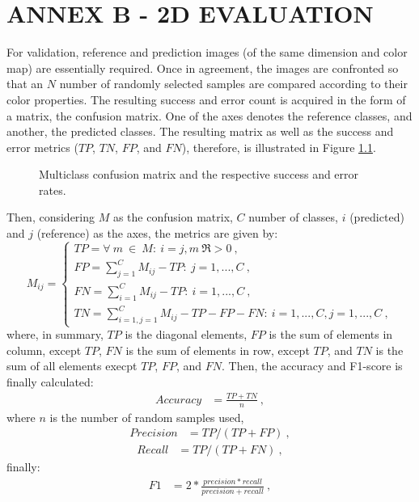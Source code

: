 \chapter{ANNEX B - 2D EVALUATION}\label{annexB} 
For validation, reference and prediction images (of the same dimension and color map) are essentially required. Once in agreement, the images are confronted so that an $N$ number of randomly selected samples are compared according to their color properties. The resulting success and error count is acquired in the form of a matrix, the confusion matrix. One of the axes denotes the reference classes, and another, the predicted classes. The resulting matrix as well as the success and error metrics ($TP$, $TN$, $FP$, and $FN$), therefore, is illustrated in Figure \ref{cm-representation}.
\begin{figure}[H]
    \centering    
    \caption{Multiclass confusion matrix and the respective success and error rates.}
    \vspace{6mm}
	\legenda{}
    \label{cm-representation}
\end{figure}

Then, considering $M$ as the confusion matrix, $C$ number of classes, $i$ (predicted) and $j$ (reference) as the axes, the metrics are given by:
\begin{equation}
 M_{ij}=
 \begin{cases}
  TP = {\forall~m~\in~M:~i=j,m~\Re>0}~,\\  
  FP = {\sum_{j=1}^CM_{ij}-TP:~j={1,...,C}}~,\\
  FN = {\sum_{i=1}^CM_{ij}-TP:~i={1,...,C}}~,\\
  TN = {\sum_{i=1,j=1}^CM_{ij} - TP - FP - FN:~i={1,...,C},j={1,...,C}}~,
 \end{cases}
\end{equation}
where, in summary, $TP$ is the diagonal elements, $FP$ is the sum of elements in column, except $TP$, $FN$ is the sum of elements in row, except $TP$, and $TN$ is the sum of all elements execpt $TP$, $FP$, and $FN$. Then, the accuracy and F1-score is finally calculated:
\begin{align}
 Accuracy &= \frac{TP + TN}{n}~,
\end{align}
where $n$ is the number of random samples used, 
\begin{align}
 Precision &= TP/(TP+FP)~,
\end{align}
\begin{align}
 Recall &= TP/(TP+FN)~,
\end{align}
finally:
\begin{align}
 F1 &= 2 * \frac{precision * recall}{precision + recall}~, 
\end{align}

